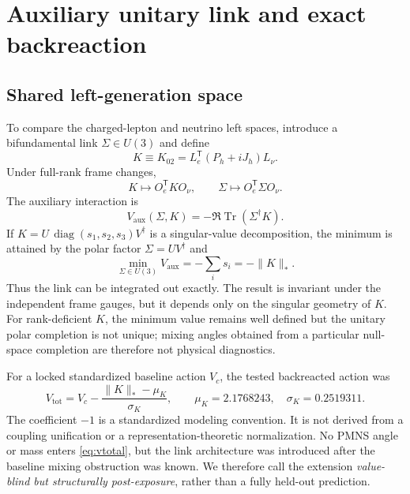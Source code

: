 \documentclass[11pt]{article}
\newcommand{\Tr}{\operatorname{Tr}}
\newcommand{\diag}{\operatorname{diag}}
\begin{document}
\section{Auxiliary unitary link and exact backreaction}
\label{sec:link}

\subsection{Shared left-generation space}

To compare the charged-lepton and neutrino left spaces, introduce a bifundamental link $\Sigma\in U(3)$ and define
\begin{equation}
  K\equiv K_{02}=L_e^{\mathsf T}(P_h+iJ_h)L_\nu.
  \label{eq:leftK}
\end{equation}
Under full-rank frame changes,
\begin{equation}
  K\mapsto O_e^{\mathsf T}KO_\nu,
  \qquad
  \Sigma\mapsto O_e^{\mathsf T}\Sigma O_\nu.
\end{equation}
The auxiliary interaction is
\begin{equation}
  V_{\mathrm{aux}}(\Sigma,K)=-\Re\Tr(\Sigma^\dagger K).
  \label{eq:vaux}
\end{equation}
If $K=U\,\diag(s_1,s_2,s_3)V^\dagger$ is a singular-value decomposition, the minimum is attained by the polar factor $\Sigma=UV^\dagger$ and
\begin{equation}
  \min_{\Sigma\in U(3)}V_{\mathrm{aux}}=-\sum_i s_i=-\|K\|_*.
  \label{eq:nuclear}
\end{equation}
Thus the link can be integrated out exactly.  The result is invariant under the independent frame gauges, but it depends only on the singular geometry of $K$.
For rank-deficient $K$, the minimum value remains well defined but the unitary polar completion is not unique; mixing angles obtained from a particular null-space completion are therefore not physical diagnostics.

For a locked standardized baseline action $V_c$, the tested backreacted action was
\begin{equation}
  V_{\mathrm{tot}}
  =V_c-\frac{\|K\|_*-\mu_K}{\sigma_K},
  \qquad
  \mu_K=2.1768243,\quad \sigma_K=0.2519311.
  \label{eq:vtotal}
\end{equation}
The coefficient $-1$ is a standardized modeling convention.  It is not derived from a coupling unification or a representation-theoretic normalization.  No PMNS angle or mass enters \cref{eq:vtotal}, but the link architecture was introduced after the baseline mixing obstruction was known.  We therefore call the extension \emph{value-blind but structurally post-exposure}, rather than a fully held-out prediction.
\end{document}
